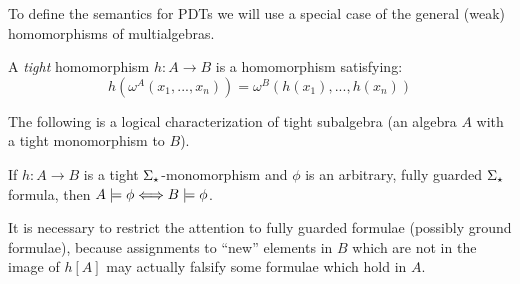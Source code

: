 To define the semantics for PDTs we will use a special case of the general (weak)
homomorphisms of multialgebras.
\begin{definition}
A {\em tight} homomorphism $h:A \to B$ is a homomorphism satisfying:
	\[ h(\omega^A(x_1,...,x_n)) = \omega^B(h(x_1),...,h(x_n)) \]
\end{definition}
The following is a logical characterization of tight subalgebra (an algebra
$A$ with a tight monomorphism to $B$).
\begin{proposition}\label{prop:satiff}
If $h:A\to B$ is a tight $\Sigma_\star$-monomorphism
and $\phi$ is an arbitrary, fully
guarded $\Sigma_\star$ formula, then $A\models\phi\Longleftrightarrow B\models\phi$.
\end{proposition}
%
It is necessary to restrict the attention to fully guarded formulae (possibly
ground formulae), because assignments to ``new'' elements in $B$ which are
not in the image of $h[A]$ may actually
falsify some formulae which hold in $A$.

